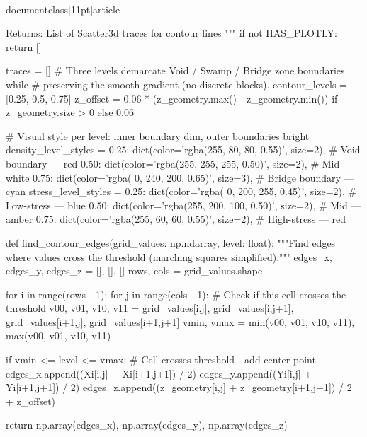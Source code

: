 \\documentclass[11pt]{article}
\begin{document}
\begin{CodeBlock}
    Returns:
        List of Scatter3d traces for contour lines
    """
    if not HAS_PLOTLY:
        return []

    traces = []
    # Three levels demarcate Void / Swamp / Bridge zone boundaries while
    # preserving the smooth gradient (no discrete blocks).
    contour_levels = [0.25, 0.5, 0.75]
    z_offset = 0.06 * (z_geometry.max() - z_geometry.min()) if z_geometry.size > 0 else 0.06

    # Visual style per level: inner boundary dim, outer boundaries bright
    density_level_styles = {
        0.25: dict(color='rgba(255,  80,  80, 0.55)', size=2),   # Void boundary — red
        0.50: dict(color='rgba(255, 255, 255, 0.50)', size=2),   # Mid — white
        0.75: dict(color='rgba(  0, 240, 200, 0.65)', size=3),   # Bridge boundary — cyan
    }
    stress_level_styles = {
        0.25: dict(color='rgba(  0, 200, 255, 0.45)', size=2),   # Low-stress — blue
        0.50: dict(color='rgba(255, 200, 100, 0.50)', size=2),   # Mid — amber
        0.75: dict(color='rgba(255,  60,  60, 0.55)', size=2),   # High-stress — red
    }

    def find_contour_edges(grid_values: np.ndarray, level: float):
        """Find edges where values cross the threshold (marching squares simplified)."""
        edges_x, edges_y, edges_z = [], [], []
        rows, cols = grid_values.shape

        for i in range(rows - 1):
            for j in range(cols - 1):
                # Check if this cell crosses the threshold
                v00, v01, v10, v11 = grid_values[i,j], grid_values[i,j+1], grid_values[i+1,j], grid_values[i+1,j+1]
                vmin, vmax = min(v00, v01, v10, v11), max(v00, v01, v10, v11)

                if vmin <= level <= vmax:
                    # Cell crosses threshold - add center point
                    edges_x.append((Xi[i,j] + Xi[i+1,j+1]) / 2)
                    edges_y.append((Yi[i,j] + Yi[i+1,j+1]) / 2)
                    edges_z.append((z_geometry[i,j] + z_geometry[i+1,j+1]) / 2 + z_offset)

        return np.array(edges_x), np.array(edges_y), np.array(edges_z)


\end{CodeBlock}
\end{document}
